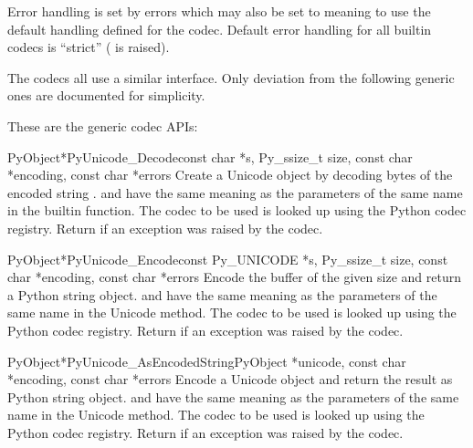 Error handling is set by errors which may also be set to \NULL{}
meaning to use the default handling defined for the codec.  Default
error handling for all builtin codecs is ``strict''
( is raised).

The codecs all use a similar interface.  Only deviation from the
following generic ones are documented for simplicity.


These are the generic codec APIs:

\begin{cfuncdesc}{PyObject*}{PyUnicode_Decode}{const char *s,
                                               Py_ssize_t size,
                                               const char *encoding,
                                               const char *errors}
  Create a Unicode object by decoding  bytes of the encoded
  string .   and  have the same
  meaning as the parameters of the same name in the
   builtin function.  The codec to be used is
  looked up using the Python codec registry.  Return \NULL{} if an
  exception was raised by the codec.
\end{cfuncdesc}

\begin{cfuncdesc}{PyObject*}{PyUnicode_Encode}{const Py_UNICODE *s,
                                               Py_ssize_t size,
                                               const char *encoding,
                                               const char *errors}
  Encode the  buffer of the given size and return
  a Python string object.   and  have the
  same meaning as the parameters of the same name in the Unicode
   method.  The codec to be used is looked up using
  the Python codec registry.  Return \NULL{} if an exception was
  raised by the codec.
\end{cfuncdesc}

\begin{cfuncdesc}{PyObject*}{PyUnicode_AsEncodedString}{PyObject *unicode,
                                               const char *encoding,
                                               const char *errors}
  Encode a Unicode object and return the result as Python string
  object.  and  have the same meaning as the
  parameters of the same name in the Unicode  method.
  The codec to be used is looked up using the Python codec registry.
  Return \NULL{} if an exception was raised by the codec.
\end{cfuncdesc}

